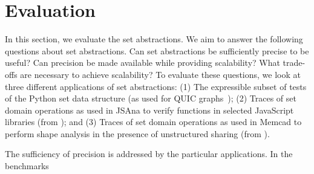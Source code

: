 \section{Evaluation}
\label{sec:evaluation}

In this section, we evaluate the set abstractions.  We aim to answer the following questions about set abstractions. Can set abstractions be sufficiently precise to be useful? Can precision be made available while providing scalability? What trade-offs are necessary to achieve scalability?  To evaluate these questions, we look at three different applications of set abstractions: (1) The expressible subset of tests of the Python set data structure (as used for QUIC graphs~\cite{ab:ecoop:13}); (2) Traces of set domain operations as used in JSAna to verify functions in selected JavaScript libraries (from \cite{hoo:14:sas,desync:15:esop}); and (3) Traces of set domain operations as used in Memcad to perform shape analysis in the presence of unstructured sharing (from \cite{memcad:15:sas}).

The sufficiency of precision is addressed by the particular applications.  In the benchmarks

\begin{table}

\end{table}


